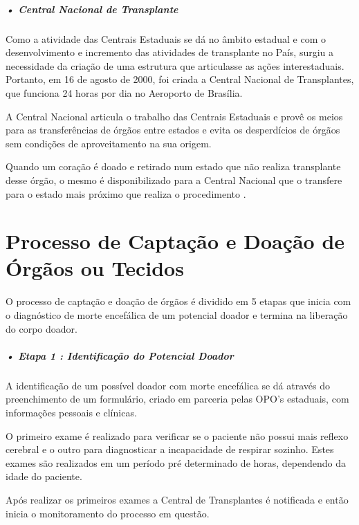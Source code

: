\documentclass[portuguese,oneside]{tcc}
\begin{document}
\subparagraph{• Central Nacional de Transplante}
Como a atividade das Centrais Estaduais se dá no âmbito estadual e com o desenvolvimento e incremento das atividades de transplante no País, surgiu a necessidade da criação de uma estrutura que articulasse as ações interestaduais. Portanto, em 16 de agosto de 2000, foi criada a Central Nacional de Transplantes, que funciona 24 horas por dia no Aeroporto de Brasília. 

A Central Nacional articula o trabalho das Centrais Estaduais e provê os meios para as transferências de órgãos entre estados e evita os desperdícios de órgãos sem condições de aproveitamento na sua origem. 

Quando um coração é doado e retirado num estado que não realiza transplante desse órgão, o mesmo é disponibilizado para a Central Nacional que o transfere para o estado mais próximo que realiza o procedimento \cite{SCSCT}.

\section{Processo de Captação e Doação de Órgãos ou Tecidos} \label{tab:processo-captacao-doacao}
O processo de captação e doação de órgãos é dividido em 5 etapas \cite{EPRECISOEDUCAR} que inicia com o diagnóstico de morte encefálica de um potencial doador e termina na liberação do corpo doador.

\subparagraph{• Etapa 1 : Identificação do Potencial Doador}

A identificação de um possível doador com morte encefálica se dá através do preenchimento de um formulário, criado em parceria pelas OPO’s estaduais, com informações pessoais e clínicas.

O primeiro exame é realizado para verificar se o paciente não possui mais reflexo cerebral e o outro para diagnosticar a incapacidade de respirar sozinho. Estes exames são realizados em um período pré determinado de horas, dependendo da idade do paciente. 

Após realizar os primeiros exames a Central de Transplantes é notificada e então inicia o monitoramento do processo em questão.
\end{document}
